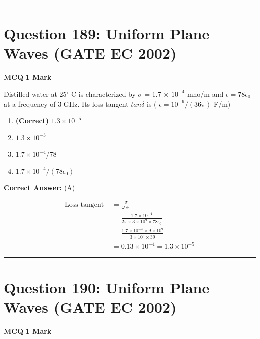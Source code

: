 \documentclass[11pt,a4paper]{article}
\begin{document}
\vspace{1.5em}
\hrule
\vspace{1.5em}

\section*{Question 189: Uniform Plane Waves (GATE EC 2002)}
\noindent \textbf{\color{primary}MCQ} \hfill \textbf{\color{secondary}1 Mark}


\noindent Distilled water at 25$^{\circ}$ C is characterized by $\sigma$ = 1.7 $\times$ $10^{-4}$ mho/m and $\epsilon =78\epsilon_{0}$ at a frequency of 3 GHz. Its loss tangent $tan\delta$
is (  $\epsilon=10^{-9} /(36\pi)$ F/m)


\begin{enumerate}[label=(\Alph*)]
    \item \textbf{(Correct)} $1.3 \times 10^{-5}$
    \item $1.3 \times 10^{-3}$
    \item $1.7 \times 10^{-4}$/78
    \item $1.7 \times 10^{-4}/(78\epsilon_{0})$
\end{enumerate}

\noindent \textbf{Correct Answer:} (A)

\begin{tcolorbox}[solbox, title=Detailed Solution -- Question 189]
\[
\begin{aligned} \operatorname{Loss} \text { tangent } &=\frac{\sigma}{\omega \in} \\ &=\frac{1.7 \times 10^{-4}}{2 \pi \times 3 \times 10^{9} \times 78 \epsilon_{0}} \\ &=\frac{1.7 \times 10^{-4} \times 9 \times 10^{9}}{3 \times 10^{9} \times 39} \\ &=0.13 \times 10^{-4}=1.3 \times 10^{-5} \end{aligned}
\]
\end{tcolorbox}

\vspace{1.5em}
\hrule
\vspace{1.5em}

\section*{Question 190: Uniform Plane Waves (GATE EC 2002)}
\noindent \textbf{\color{primary}MCQ} \hfill \textbf{\color{secondary}1 Mark}
\end{document}
